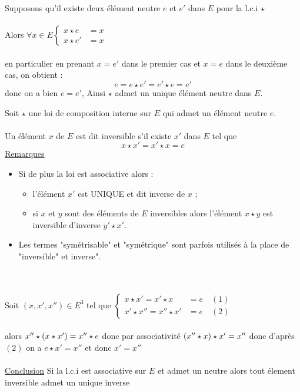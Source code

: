 \begin{dem}
    Supposons qu'il existe deux élément neutre \(e\) et \(e'\) dans \(E\) pour la l.c.i \(\star\)\\~\\
    Alors \(\forall x \in E\begin{cases}
        x \star e & = x \\
        x \star e' &= x 
    \end{cases}\)\\~\\
    en particulier en prenant \(x = e'\) dans le premier cas et \(x = e\) dans le deuxième cas, on obtient :
    \[e = e \star e' = e' \star e = e'\]
    donc on a bien \(e = e'\), Ainsi \(\star\) admet un unique élément neutre dans \(E\).
\end{dem}

\begin{defprop}[Inversibilité]
    Soit \(\star\) une loi de composition interne sur \(E\) qui admet un élément neutre \(e\).\\~\\
    Un élément \(x\) de \(E\) est dit inversible s’il existe \(x'\) dans \(E\) tel que
    \[x \star x' = x' \star x = e\]
    \underline{Remarques}
    \begin{itemize}
        \item Si de plus la loi est associative alors :
        \begin{itemize}
            \item l’élément \(x'\) est UNIQUE et dit inverse de \(x\) ;
            \item si \(x\) et \(y\) sont des éléments de \(E\) inversibles alors l’élément \(x \star y\) est inversible d’inverse \(y' \star x'\).
        \end{itemize}
        \item Les termes "symétrisable" et "symétrique" sont parfois utilisés à la place de "inversible" et inverse".
    \end{itemize}
\end{defprop}

\begin{dem}
    ~\\~\\
    Soit \((x,x',x'') \in E^3\) tel que \(\begin{cases}
        x \star x' = x' \star x &= e \quad (1)\\
        x' \star x'' = x'' \star x' &= e \quad(2)
    \end{cases}\)\\~\\
    alors \(x''\star \left( x \star x'\right) = x'' \star e \) donc par associativité  \(\left(x'' \star x\right) \star x' = x''\) donc d'après \((2)\) on a \(e \star x' = x''\) et donc \(x' = x''\)\\~\\
    \underline{Conclusion} Si la l.c.i est associative sur \(E\) et admet un neutre alors tout élement inversible admet un unique inverse
\end{dem}

